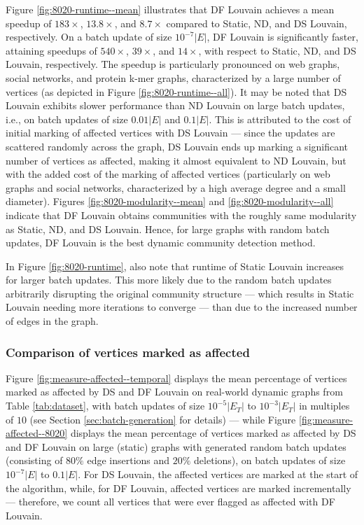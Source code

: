 Figure \ref{fig:8020-runtime--mean} illustrates that DF Louvain achieves a mean speedup of $183\times$, $13.8\times$, and $8.7\times$ compared to Static, ND, and DS Louvain, respectively. On a batch update of size $10^{-7}|E|$, DF Louvain is significantly faster, attaining speedups of $540\times$, $39\times$, and $14\times$, with respect to Static, ND, and DS Louvain, respectively. The speedup is particularly pronounced on web graphs, social networks, and protein k-mer graphs, characterized by a large number of vertices (as depicted in Figure \ref{fig:8020-runtime--all}). It may be noted that DS Louvain exhibits slower performance than ND Louvain on large batch updates, i.e., on batch updates of size $0.01|E|$ and $0.1|E|$. This is attributed to the cost of initial marking of affected vertices with DS Louvain --- since the updates are scattered randomly across the graph, DS Louvain ends up marking a significant number of vertices as affected, making it almost equivalent to ND Louvain, but with the added cost of the marking of affected vertices (particularly on web graphs and social networks, characterized by a high average degree and a small diameter). Figures \ref{fig:8020-modularity--mean} and \ref{fig:8020-modularity--all} indicate that DF Louvain obtains communities with the roughly same modularity as Static, ND, and DS Louvain. Hence, for large graphs with random batch updates, DF Louvain is the best dynamic community detection method.

In Figure \ref{fig:8020-runtime}, also note that runtime of Static Louvain increases for larger batch updates. This more likely due to the random batch updates arbitrarily disrupting the original community structure --- which results in Static Louvain needing more iterations to converge --- than due to the increased number of edges in the graph.


\subsubsection{Comparison of vertices marked as affected}

Figure \ref{fig:measure-affected--temporal} displays the mean percentage of vertices marked as affected by DS and DF Louvain on real-world dynamic graphs from Table \ref{tab:dataset}, with batch updates of size $10^{-5}|E_T|$ to $10^{-3}|E_T|$ in multiples of $10$ (see Section \ref{sec:batch-generation} for details) --- while Figure \ref{fig:measure-affected--8020} displays the mean percentage of vertices marked as affected by DS and DF Louvain on large (static) graphs with generated random batch updates (consisting of $80\%$ edge insertions and $20\%$ deletions), on batch updates of size $10^{-7}|E|$ to $0.1|E|$. For DS Louvain, the affected vertices are marked at the start of the algorithm, while, for DF Louvain, affected vertices are marked incrementally --- therefore, we count all vertices that were ever flagged as affected with DF Louvain.

